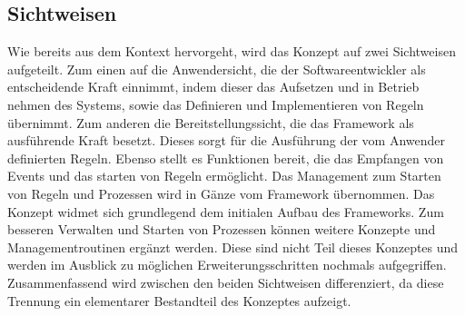     \subsection{Sichtweisen}
    \label{subsec:sichtweisen}
        Wie bereits aus dem Kontext hervorgeht, wird das Konzept auf zwei Sichtweisen aufgeteilt. Zum einen auf die 
        Anwendersicht, die der Softwareentwickler als entscheidende Kraft einnimmt, indem dieser das Aufsetzen und in 
        Betrieb nehmen des Systems, sowie das Definieren und Implementieren von Regeln übernimmt. Zum anderen die 
        Bereitstellungssicht, die das Framework als ausführende Kraft besetzt. Dieses sorgt für die Ausführung der vom 
        Anwender definierten Regeln. Ebenso stellt es Funktionen bereit, die das Empfangen von Events und das starten 
        von Regeln ermöglicht. Das Management zum Starten von Regeln und Prozessen wird in Gänze vom Framework übernommen. 
        Das Konzept widmet sich grundlegend dem initialen Aufbau des Frameworks. Zum besseren Verwalten und Starten von 
        Prozessen können weitere Konzepte und Managementroutinen ergänzt werden. Diese sind nicht Teil dieses Konzeptes und 
        werden im Ausblick zu möglichen Erweiterungsschritten nochmals aufgegriffen.
        \\
        \linebreak
        Zusammenfassend wird zwischen den beiden Sichtweisen differenziert, da diese Trennung ein elementarer Bestandteil des Konzeptes 
        aufzeigt. 

